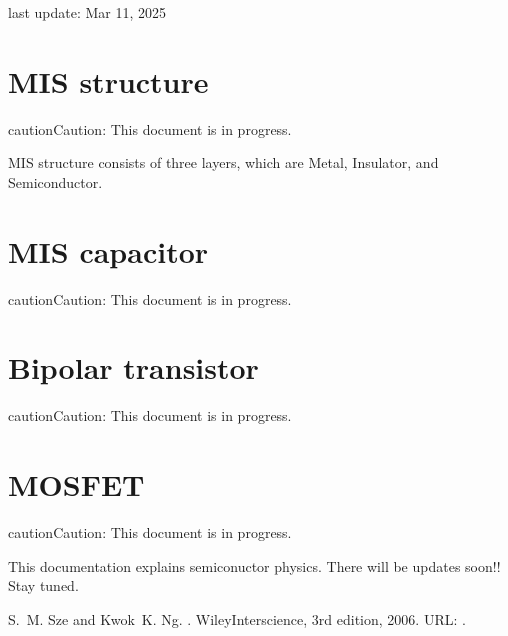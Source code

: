\documentclass[letterpaper,10pt,english]{sphinxmanual}
\numberwithin{equation}{section}
\begin{document}
\sphinxAtStartPar
last update: Mar 11, 2025

\sphinxstepscope


\section{MIS structure}
\label{\detokenize{MIS_structure:mis-structure}}\label{\detokenize{MIS_structure::doc}}
\begin{sphinxadmonition}{caution}{Caution:}
\sphinxAtStartPar
This document is in progress.
\end{sphinxadmonition}

\sphinxAtStartPar
MIS structure consists of three layers, which are Metal, Insulator, and Semiconductor.

\sphinxstepscope


\section{MIS capacitor}
\label{\detokenize{MIS_capacitor:mis-capacitor}}\label{\detokenize{MIS_capacitor::doc}}
\begin{sphinxadmonition}{caution}{Caution:}
\sphinxAtStartPar
This document is in progress.
\end{sphinxadmonition}

\sphinxstepscope


\section{Bipolar transistor}
\label{\detokenize{Bipolar_transistor:bipolar-transistor}}\label{\detokenize{Bipolar_transistor::doc}}
\begin{sphinxadmonition}{caution}{Caution:}
\sphinxAtStartPar
This document is in progress.
\end{sphinxadmonition}

\sphinxstepscope


\section{MOSFET}
\label{\detokenize{MOSFET:mosfet}}\label{\detokenize{MOSFET::doc}}
\begin{sphinxadmonition}{caution}{Caution:}
\sphinxAtStartPar
This document is in progress.
\end{sphinxadmonition}

\sphinxAtStartPar
This documentation explains semiconuctor physics.
There will be updates soon!!
Stay tuned.

\sphinxAtStartPar
{}

\begin{sphinxthebibliography}{1}
\sphinxAtStartPar
S. M. Sze and Kwok K. Ng. . Wiley\sphinxhyphen{}Interscience, 3rd edition, 2006. URL: .
\end{sphinxthebibliography}



\renewcommand{\indexname}{Index}
\printindex
\end{document}
